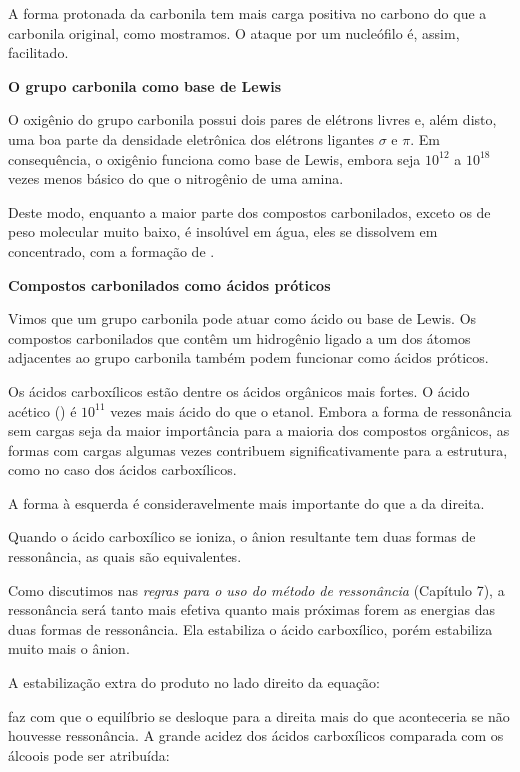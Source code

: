 A forma protonada da carbonila tem mais carga positiva no carbono do que a carbonila original, como mostramos. O ataque por um nucleófilo é, assim, facilitado.

\noindent\textbf{O grupo carbonila como base de Lewis}

O oxigênio do grupo carbonila possui dois pares de elétrons livres e, além disto, uma boa parte da densidade eletrônica dos elétrons ligantes $\sigma$ e $\pi$. Em consequência, o oxigênio funciona como base de Lewis, embora seja $10^{12}$ a $10^{18}$ vezes menos básico do que o nitrogênio de uma amina.


Deste modo, enquanto a maior parte dos compostos carbonilados, exceto os de peso molecular muito baixo, é insolúvel em água, eles se dissolvem em  concentrado, com a formação de .

\noindent\textbf{Compostos carbonilados como ácidos próticos}

Vimos que um grupo carbonila pode atuar como ácido ou base de Lewis. Os compostos carbonilados que contêm um hidrogênio ligado a um dos átomos adjacentes ao grupo carbonila também podem funcionar como ácidos próticos.



Os ácidos carboxílicos estão dentre os ácidos orgânicos mais fortes. O ácido acético () é $10^{11}$ vezes mais ácido do que o etanol. Embora a forma de ressonância sem cargas seja da maior importância para a maioria dos compostos orgânicos, as formas com cargas algumas vezes contribuem significativamente para a estrutura, como no caso dos ácidos carboxílicos.

A forma à esquerda é consideravelmente mais importante do que a da direita.

Quando o ácido carboxílico se ioniza, o ânion resultante tem duas formas de ressonância, as quais são equivalentes.


Como discutimos nas \textit{regras para o uso do método de ressonância} (Capítulo 7), a ressonância será tanto mais efetiva quanto mais próximas forem as energias das duas formas de ressonância. Ela estabiliza o ácido carboxílico, porém estabiliza muito mais o ânion.

A estabilização extra do produto no lado direito da equação:



\noindent faz com que o equilíbrio se desloque para a direita mais do que aconteceria se não houvesse ressonância. A grande acidez dos ácidos carboxílicos comparada com os álcoois pode ser atribuída:

